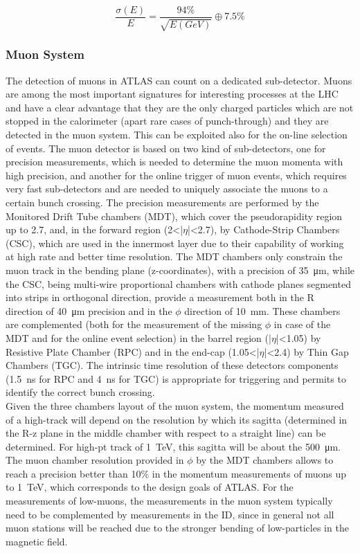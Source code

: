 \begin{equation}
\frac{\sigma (E)}{E} = \frac{94\%}{\sqrt{E(GeV)}} \oplus 7.5\%
\end{equation}



\subsubsection{Muon System}

The detection of muons in ATLAS can count on a dedicated sub-detector. Muons are among the most important signatures for interesting processes at the LHC and have a clear advantage that they are the only charged particles which are not stopped in the calorimeter (apart rare cases of punch-through) and they are detected in the muon system. This can be exploited also for the on-line selection of events.
The muon detector is based on two kind of sub-detectors, one for precision measurements, which is needed to determine the muon momenta with high precision, and another for the online trigger of muon events, which requires very fast sub-detectors and are needed to uniquely associate the muons to a certain bunch crossing. The precision measurements are performed by the Monitored Drift Tube chambers (MDT), which cover the pseudorapidity region up to 2.7, and, in the forward region (2<|$\eta$|<2.7), by Cathode-Strip Chambers (CSC), which are used in the innermost layer due to their capability of working at high rate and better time resolution.
The MDT chambers only constrain the muon track in the bending plane (z-coordinates), with a precision of \SI{35}{\micro\meter}, while the CSC, being multi-wire proportional chambers with cathode planes segmented into strips in orthogonal direction, provide a measurement both in the R direction of \SI{40}{\micro \meter} precision and in the $\phi$ direction of \SI{10}{\milli\meter}.
These chambers are complemented (both for the measurement of the missing $\phi$ in case of the MDT and for the online event selection) in the barrel region (|$\eta$|<1.05) by Resistive Plate Chamber (RPC) and in the end-cap (1.05<|$\eta$|<2.4) by Thin Gap Chambers (TGC). The intrinsic time resolution of these detectors components (\SI{1.5}{\nano\second} for RPC and \SI{4}{\nano\second} for TGC) is appropriate for triggering and permits to identify the correct bunch crossing.\\
Given the three chambers layout of the muon system, the momentum measured of a high-\pt track will depend on the resolution by which its sagitta (determined in the R-z plane in the middle chamber with respect to a straight line) can be determined. For high-pt track of \SI{1}{\TeV}, this sagitta will be about the \SI{500}{\micro \meter}. The muon chamber resolution provided in $\phi$ by the MDT chambers allows to reach a precision better than 10\% in the momentum measurements of muons up to \SI{1}{\TeV}, which corresponds to the design goals of ATLAS.
For the measurements of low-\pt muons, the measurements in the muon system typically need to be complemented by measurements in the ID, since in general not all muon stations will be reached due to the stronger bending of low-\pt particles in the magnetic field.

